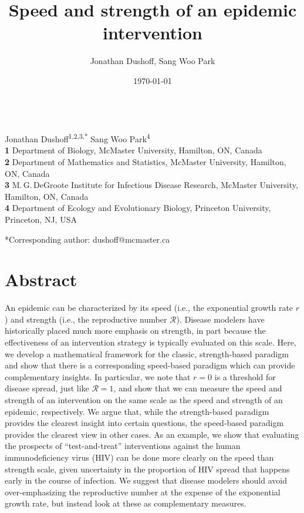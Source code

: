 \documentclass[12pt]{article}
\title{Speed and strength of an epidemic intervention}
\author{Jonathan Dushoff, Sang Woo Park}
\date{\today}
\newcommand{\RR}{\ensuremath{{\mathcal R}}}
\begin{document}
\begin{flushleft}{
	\Large
	\textbf{}
}
\newline
\\
Jonathan Dushoff\textsuperscript{1,2,3,*}
Sang Woo Park\textsuperscript{4}
\\
\bigskip
\textbf{1} Department of Biology, McMaster University, Hamilton, ON, Canada
\\
\textbf{2} Department of Mathematics and Statistics, McMaster University, Hamilton, ON, Canada
\\
\textbf{3} M.\,G.\,DeGroote Institute for Infectious Disease Research, McMaster University, Hamilton, ON, Canada
\\
\textbf{4} Department of Ecology and Evolutionary Biology, Princeton University, Princeton, NJ, USA
\\
\bigskip

*Corresponding author: dushoff@mcmaster.ca
\end{flushleft}

\section*{Abstract}

An epidemic can be characterized by its speed (i.e., the exponential growth rate $r$) and strength (i.e., the reproductive number \RR).
Disease modelers have historically placed much more emphasis on strength, in part because the effectiveness of an intervention strategy is typically evaluated on this scale.  
Here, we develop a mathematical framework for the classic, strength-based paradigm and show that there is a corresponding speed-based paradigm which can provide complementary insights.
In particular, we note that $r=0$ is a threshold for disease spread, just like $\RR=1$, and show that we can measure the speed and strength of an intervention on the same scale as the speed and strength of an epidemic, respectively.
We argue that, while the strength-based paradigm provides the clearest insight into certain questions, the speed-based paradigm provides the clearest view in other cases.
As an example, we show that evaluating the prospects of ``test-and-treat'' interventions against the human immunodeficiency virus (HIV) can be done more clearly on the speed than strength scale, given uncertainty in the proportion of HIV spread that happens early in the course of infection. 
We suggest that disease modelers should avoid over-emphasizing the reproductive number at the expense of the exponential growth rate, but instead look at these as complementary measures.
\end{document}
